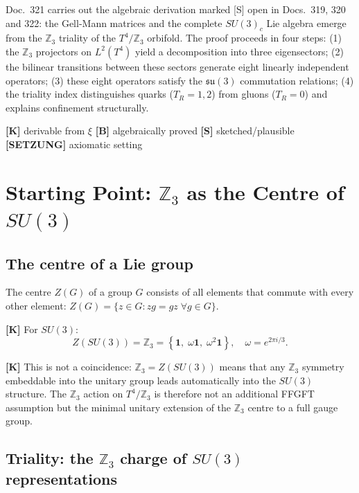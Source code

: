 Doc.~321 carries out the algebraic derivation marked [S] open in
Docs.~319, 320 and 322: the Gell-Mann matrices and the complete
$SU(3)_c$ Lie algebra emerge from the $\mathbb{Z}_3$ triality of the
$T^4/\mathbb{Z}_3$ orbifold. The proof proceeds in four steps:
(1) the $\mathbb{Z}_3$ projectors on $L^2(T^4)$ yield a decomposition
into three eigensectors;
(2) the bilinear transitions between these sectors generate eight
linearly independent operators;
(3) these eight operators satisfy the $\mathfrak{su}(3)$ commutation
relations;
(4) the triality index distinguishes quarks ($T_R=1,2$) from gluons
($T_R=0$) and explains confinement structurally.

\begin{keyresult}
\textbf{[K]} derivable from $\xi$ \quad
\textbf{[B]} algebraically proved \quad
\textbf{[S]} sketched/plausible \quad
\textbf{[SETZUNG]} axiomatic setting
\end{keyresult}

\section{Starting Point: $\mathbb{Z}_3$ as the Centre of $SU(3)$}

\subsection{The centre of a Lie group}

The centre $Z(G)$ of a group $G$ consists of all elements that
commute with every other element: $Z(G) = \{z \in G : zg = gz
\;\forall g\in G\}$.

\textbf{[K]} For $SU(3)$:
\begin{equation}
  Z(SU(3)) = \mathbb{Z}_3 =
  \left\{\mathbf{1},\;\omega\mathbf{1},\;\omega^2\mathbf{1}\right\},
  \quad \omega = e^{2\pi i/3}.
  \label{eq:centre}
\end{equation}

\textbf{[K]} This is not a coincidence: $\mathbb{Z}_3 = Z(SU(3))$
means that any $\mathbb{Z}_3$ symmetry embeddable into the unitary
group leads automatically into the $SU(3)$ structure. The $\mathbb{Z}_3$
action on $T^4/\mathbb{Z}_3$ is therefore not an additional FFGFT
assumption but the minimal unitary extension of the $\mathbb{Z}_3$
centre to a full gauge group.

\subsection{Triality: the $\mathbb{Z}_3$ charge of $SU(3)$ representations}

